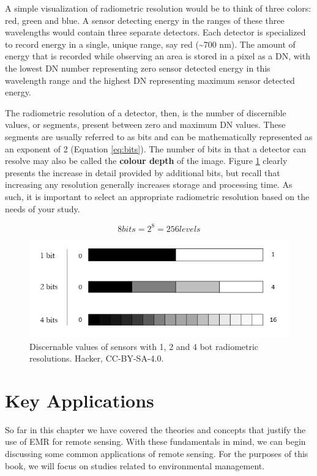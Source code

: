 \documentclass[
]{book}
\begin{document}
A simple visualization of radiometric resolution would be to think of three colors: red, green and blue. A sensor detecting energy in the ranges of these three wavelengths would contain three separate detectors. Each detector is specialized to record energy in a single, unique range, say red (\textasciitilde700 nm). The amount of energy that is recorded while observing an area is stored in a pixel as a DN, with the lowest DN number representing zero sensor detected energy in this wavelength range and the highest DN representing maximum sensor detected energy.

The radiometric resolution of a detector, then, is the number of discernible values, or segments, present between zero and maximum DN values. These segments are usually referred to as bits and can be mathematically represented as an exponent of 2 (Equation \eqref{eq:bits}). The number of bits in that a detector can resolve may also be called the \textbf{colour depth} of the image. Figure \ref{fig:11-radiometric} clearly presents the increase in detail provided by additional bits, but recall that increasing any resolution generally increases storage and processing time. As such, it is important to select an appropriate radiometric resolution based on the needs of your study.

\begin{equation}
8 bits = 2^8 = 256 levels
\label{eq:bits}
\end{equation}

\begin{figure}
\includegraphics[width=0.75\linewidth]{images/11-radiometric-res} \caption{Discernable values of sensors with 1, 2 and 4 bot radiometric resolutions. Hacker, CC-BY-SA-4.0.}\label{fig:11-radiometric}
\end{figure}

\section{Key Applications}\label{key-applications}

So far in this chapter we have covered the theories and concepts that justify the use of EMR for remote sensing. With these fundamentals in mind, we can begin discussing some common applications of remote sensing. For the purposes of this book, we will focus on studies related to environmental management.
\end{document}
